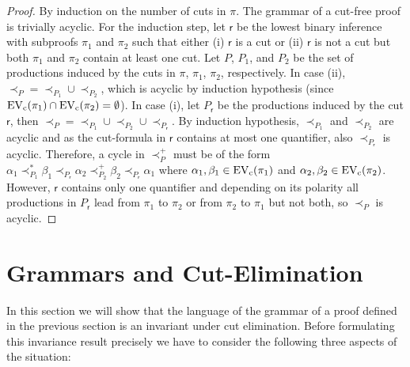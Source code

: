 \documentclass{LMCS}
\theoremstyle{plain}
\theoremstyle{definition}
\def\rr{\mathsf{r}}
\newcommand{\sreach}[1]{\mathbin{\prec_{#1}^*}}
\newcommand{\preach}[1]{\mathbin{\prec_{#1}^+}}
\newcommand{\nreach}[1]{\mathbin{\prec_{#1}^{}}}
\newcommand{\reach}[1]{\mathbin{\prec_{#1}}}
\begin{document}
\begin{proof}
  By induction on the number of cuts in $\pi$. The grammar of a
  cut-free proof is trivially acyclic. For the induction step, let
  $\rr$ be the lowest binary inference with subproofs $\pi_1$ and
  $\pi_2$ such that either (i) $\rr$ is a cut or (ii) $\rr$ is not a cut
  but both $\pi_1$ and $\pi_2$ contain at least one cut. Let $P$,
  $P_1$, and $P_2$ be the set of productions induced by the cuts in
  $\pi$, $\pi_1$, $\pi_2$, respectively. In case (ii),
  $\reach{P}=\reach{P_1}\cup\reach{P_2}$, which is acyclic by
  induction hypothesis (since
  $\mathrm{EV_c}(\pi_1)\cap\mathrm{EV_c}(\pi_2)=\emptyset$). In case (i), let $P_\rr$ be
  the productions induced by the cut $\rr$, then
  $\reach{P}=\reach{P_1}\cup\reach{P_2}\cup\reach{P_\rr}$. By
  induction hypothesis, $\reach{P_1}$ and $\reach{P_2}$ are acyclic
  and as the cut-formula in $\rr$ contains at most one quantifier,
  also $\reach{P_\rr}$ is acyclic. Therefore, a cycle in $\preach{P}$
  must be of the form
  $\alpha_1\sreach{P_1}\beta_1\nreach{P_\rr}\alpha_2\preach{P_2}\beta_2
  \nreach{P_\rr}\alpha_1$ where $\alpha_1,\beta_1\in\mathrm{EV_c}(\pi_1)$ and
  $\alpha_2,\beta_2\in\mathrm{EV_c}(\pi_2)$. However, $\rr$ contains only one
  quantifier and depending on its polarity all productions in
  $P_\rr$ lead from $\pi_1$ to $\pi_2$ or from $\pi_2$ to $\pi_1$
  but not both, so $\reach{P}$ is acyclic.
\end{proof}

\section{Grammars and Cut-Elimination}\label{sec.grammars_cutel}

In this section we will show that the language of the grammar of a
proof defined in the previous section is an invariant under cut
elimination. Before formulating this invariance result precisely we have to consider the
following three aspects of the situation:
\end{document}
